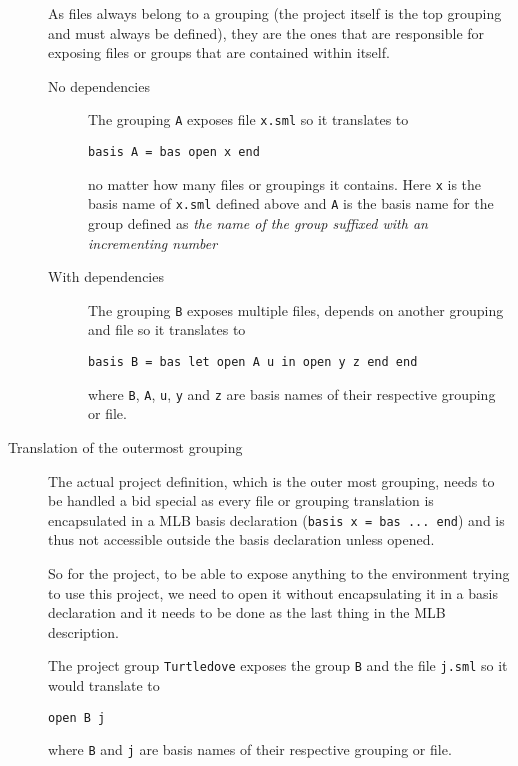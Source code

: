 \begin{description}
  As files always belong to a grouping (the project itself is the top grouping and
  must always be defined), they are the ones that are responsible for exposing
  files or groups that are contained within itself.
  
  \begin{description}
  \item[No dependencies]
    
    The grouping \texttt{A} exposes file \texttt{x.sml} so it translates to
    
\begin{lstlisting}
basis A = bas open x end
\end{lstlisting}
    
    no matter how many files or groupings it contains. Here \texttt{x} is the
    basis name of \texttt{x.sml} defined above and \texttt{A} is the basis name
    for the group defined as \textit{the name of the group suffixed with an
      incrementing number}
    
  \item[With dependencies] The grouping \texttt{B} exposes multiple files, depends
    on another grouping and file so it translates to
    
\begin{lstlisting}
basis B = bas let open A u in open y z end end
\end{lstlisting}
    
    where \texttt{B}, \texttt{A}, \texttt{u}, \texttt{y} and \texttt{z} are
    basis names of their respective grouping or file.
  \end{description}
  
  
\item[Translation of the outermost grouping]
  
  The actual project definition, which is the outer most grouping, needs to be
  handled a bid special as every file or grouping translation is encapsulated in
  a MLB basis declaration (\texttt{basis x = bas ... end}) and is thus not
  accessible outside the basis declaration unless opened.
  
  So for the project, to be able to expose anything to the environment trying to
  use this project, we need to open it without encapsulating it in a basis
  declaration and it needs to be done as the last thing in the MLB description.
  
  The project group \texttt{Turtledove} exposes the group \texttt{B} and the
  file \texttt{j.sml} so it would translate to
  
\begin{lstlisting}
open B j
\end{lstlisting}
  
  where \texttt{B} and \texttt{j} are basis names of their respective grouping
  or file.
  
\end{description}



